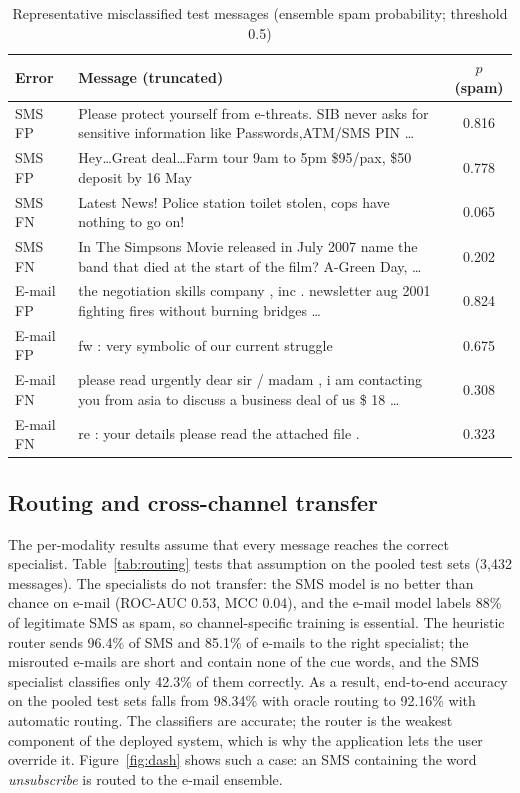 \documentclass[12pt,a4paper]{report}
\begin{document}
\begin{table}[!htbp]
  \centering
  \caption{Representative misclassified test messages (ensemble spam probability; threshold 0.5)}
  \label{tab:errors}
  \small
  \begin{tabular}{|L{1.7cm}|L{10.3cm}|c|}
    \hline
    \textbf{Error} & \textbf{Message (truncated)} & \textbf{$p$(spam)} \\
    \hline
    SMS FP & Please protect yourself from e-threats. SIB never asks for sensitive information like Passwords,ATM/SMS PIN \ldots & 0.816 \\
    \hline
    SMS FP & Hey\ldots Great deal\ldots Farm tour 9am to 5pm \$95/pax, \$50 deposit by 16 May & 0.778 \\
    \hline
    SMS FN & Latest News! Police station toilet stolen, cops have nothing to go on! & 0.065 \\
    \hline
    SMS FN & In The Simpsons Movie released in July 2007 name the band that died at the start of the film? A-Green Day, \ldots & 0.202 \\
    \hline
    E-mail FP & the negotiation skills company , inc . newsletter aug 2001 fighting fires without burning bridges \ldots & 0.824 \\
    \hline
    E-mail FP & fw : very symbolic of our current struggle & 0.675 \\
    \hline
    E-mail FN & please read urgently dear sir / madam , i am contacting you from asia to discuss a business deal of us \$ 18 \ldots & 0.308 \\
    \hline
    E-mail FN & re : your details please read the attached file . & 0.323 \\
    \hline
  \end{tabular}
\end{table}

\subsection{Routing and cross-channel transfer}\label{sec:routing}

The per-modality results assume that every message reaches the correct
specialist. Table~\ref{tab:routing} tests that assumption on the pooled test
sets (3,432 messages). The specialists do not transfer: the SMS model is no
better than chance on e-mail (ROC-AUC 0.53, MCC 0.04), and the e-mail model
labels 88\% of legitimate SMS as spam, so channel-specific training is
essential. The heuristic router sends 96.4\% of SMS and 85.1\% of e-mails to
the right specialist; the misrouted e-mails are short and contain none of the
cue words, and the SMS specialist classifies only 42.3\% of them correctly. As
a result, end-to-end accuracy on the pooled test sets falls from 98.34\% with
oracle routing to 92.16\% with automatic routing. The classifiers are
accurate; the router is the weakest component of the deployed system, which
is why the application lets the user override it. Figure~\ref{fig:dash} shows such a case: an SMS containing the word \emph{unsubscribe} is
routed to the e-mail ensemble.
\end{document}
